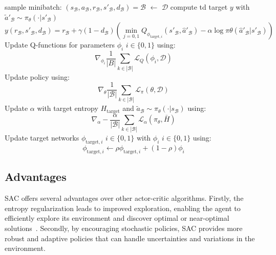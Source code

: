 \begin{algorithm}
\begin{algorithmic}
			\State{} sample minibatch: $(s_\mathcal{B}, a_\mathcal{B}, r_\mathcal{B}, s'_\mathcal{B}, d_\mathcal{B}) = \mathcal{B}$ $\leftarrow$ $\mathcal{D}$ 
			\State{} compute td target $y$ with $\tilde{a}'_\mathcal{B} \sim \pi_\theta(\cdot|s'_\mathcal{B})$
			\begin{equation}\label{eqn:td-target-batch}
				y(r_\mathcal{B}, s'_\mathcal{B}, d_\mathcal{B}) = r_\mathcal{B} + \gamma(1 - d_\mathcal{B}) \left(\min_{j=0,1}Q_{\phi_{\text{target}, i}}(s'_\mathcal{B}, \hat{a}'_\mathcal{B}) - \alpha \log \pi\theta(\hat{a}'_\mathcal{B}| s'_\mathcal{B})\right)
			\end{equation}
			\State{} Update Q-functions for parameters $\phi_i$ $i \in \{0, 1\}$ using:
			\begin{equation}\label{eqn:q-update}
				\nabla_{\phi_i} \frac{1}{|B|} \sum_{k \in |\mathcal{B}|}\mathcal{L}_Q(\phi_i, \mathcal{D})   
			\end{equation}
			\State{} Update policy using:
			\begin{equation}\label{eqn:policy-update}
			   \nabla_{\theta} \frac{1}{|\mathcal{B}|}\sum_{k \in |\mathcal{B}|}\mathcal{L}_\pi(\theta, \mathcal{D})
			\end{equation}
			\State{} Update $\alpha$ with target entropy $H_\text{target}$ and $\tilde{a}_\mathcal{B} \sim \pi_\theta(\cdot|s_\mathcal{B})$ using:
			\begin{equation*}
				\nabla_\alpha -\frac{\alpha}{|\mathcal{B}|} \sum_{k \in |\mathcal{B}|} \mathcal{L}_\alpha(\pi_\theta, \bar{H})
			\end{equation*}
			\State{} Update target networks $\phi_{\text{target}, i}$ $i \in \{0, 1\}$ with $\phi_i$ $i \in \{0, 1\}$ using:
			\begin{equation*}
				\phi_{\text{target}, i} \leftarrow \rho \phi_{\text{target}, i} + (1 - \rho) \phi_i
			\end{equation*}
			\EndFor{}
			\EndIf{}
			\EndFor{}
	\end{algorithmic}
\end{algorithm}


\subsection{Advantages}

SAC offers several advantages over other actor-critic algorithms. Firstly, the entropy regularization leads to improved exploration, enabling the agent to efficiently explore its environment and discover optimal or near-optimal solutions~\cite{SAC_Paper}. Secondly, by encouraging stochastic policies, SAC provides more robust and adaptive policies that can handle uncertainties and variations in the environment.

